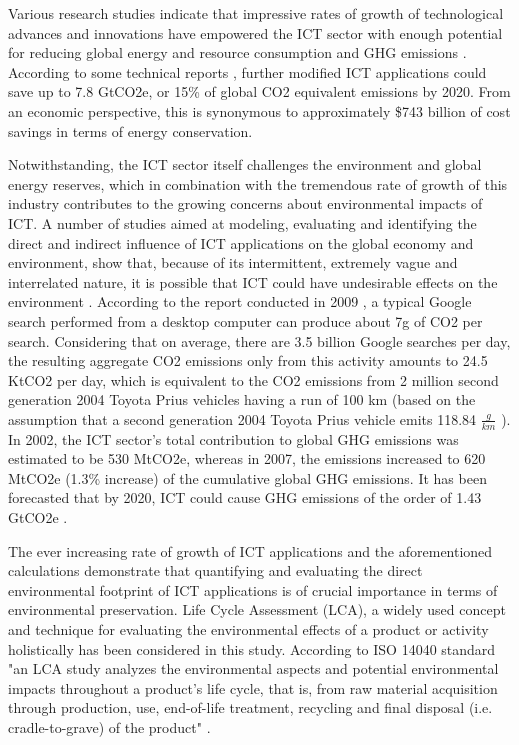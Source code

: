 \documentclass[conference]{IEEEtran}
\begin{document}
Various research studies indicate that impressive rates of growth of technological advances and innovations have empowered the ICT sector with enough potential for reducing global energy and resource consumption and GHG emissions  \cite{10046363,924525, 6360455}. According to some technical reports \cite{3758490, 7282419}, further modified ICT applications could save up to 7.8 GtCO2e, or 15\% of global CO2 equivalent emissions by 2020. From an economic perspective, this is synonymous to approximately \$743 billion of cost savings in terms of energy conservation.

Notwithstanding, the ICT sector itself challenges the environment and global energy reserves, which in combination with the tremendous rate of growth of this industry contributes to the growing concerns about environmental impacts of ICT. A number of studies aimed at modeling, evaluating and identifying the direct and indirect influence of ICT applications on the global economy and environment, show that, because of its intermittent, extremely vague and interrelated nature, it is possible that ICT could have undesirable effects on the environment  \cite{Hilty20061618, 6083606, Bull201410}. According to the report conducted in 2009 \cite{7282419}, a typical Google search performed from a desktop computer can produce about 7g of CO2 per search. Considering that on average, there are 3.5 billion Google searches per day, the resulting aggregate CO2 emissions only from this activity amounts to 24.5 KtCO2 per day, which is equivalent to the CO2 emissions from 2 million second generation 2004 Toyota Prius vehicles having a run of 100 km (based on the assumption that a second generation 2004 Toyota Prius vehicle emits 118.84 $\frac{g}{km}$ \cite{6728838}). In 2002, the ICT sector's total contribution to global GHG emissions was estimated to be 530 MtCO2e, whereas in 2007, the emissions increased to 620 MtCO2e (1.3\% increase) of the cumulative global GHG emissions. It has been forecasted that by 2020, ICT could cause GHG emissions of the order of 1.43 GtCO2e  \cite{malmodin2013future, 3758490}.

The ever increasing rate of growth of ICT applications and the aforementioned calculations demonstrate that quantifying and evaluating the direct environmental footprint of ICT applications is of crucial importance in terms of environmental preservation. Life Cycle Assessment (LCA), a widely used concept and technique for evaluating the environmental effects of a product or activity holistically has been considered in this study. According to ISO 14040 standard "an LCA study analyzes the environmental aspects and potential environmental impacts throughout a product's life cycle, that is, from raw material acquisition through production, use, end-of-life treatment, recycling and final disposal (i.e. cradle-to-grave) of the product" \cite{ISO140402006}.
\end{document}
